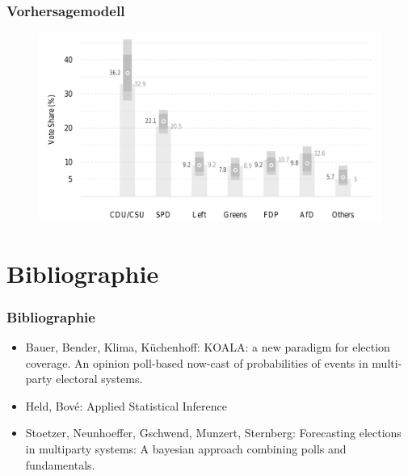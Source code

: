 \documentclass[aspectratio=169,xcolor=dvipsnames]{beamer}
\begin{document}
\begin{frame}
	\frametitle{Vorhersagemodell}
	\begin{figure}
		\includegraphics[height=0.85\textheight]{forecast}
	\end{figure}
\end{frame}

\section{Bibliographie}
\begin{frame}
\frametitle{Bibliographie}
\begin{itemize}
\item Bauer, Bender, Klima, Küchenhoff: KOALA: a new paradigm
for election coverage. An opinion poll-based now-cast of probabilities of events in multi-party electoral systems.
\item Held, Bov\'{e}: Applied Statistical Inference
\item Stoetzer, Neunhoeffer, Gschwend, Munzert, Sternberg: Forecasting elections in multiparty systems: A bayesian approach combining polls and fundamentals.
\end{itemize}
\end{frame}
\end{document}

